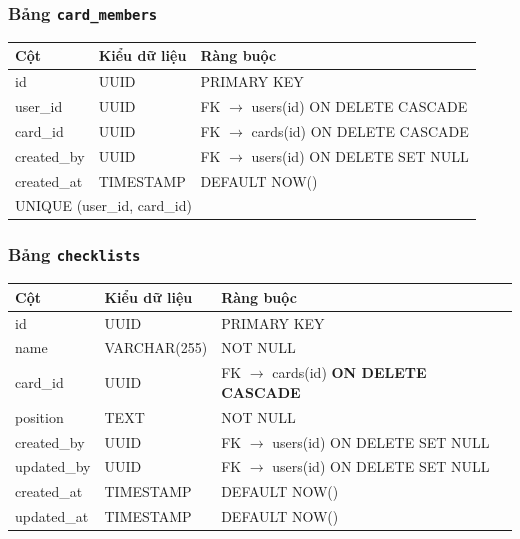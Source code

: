\subsubsection*{Bảng \texttt{card\_members}}
\begin{table}[H]
\centering
\begin{tabularx}{\textwidth}{|l|l|X|}
\hline
\rowcolor{gray!20}
\textbf{Cột} & \textbf{Kiểu dữ liệu} & \textbf{Ràng buộc} \\
\hline
id & UUID & PRIMARY KEY \\
\hline
user\_id & UUID & FK $\rightarrow$ users(id) ON DELETE CASCADE \\
\hline
card\_id & UUID & FK $\rightarrow$ cards(id) ON DELETE CASCADE \\
\hline
created\_by & UUID & FK $\rightarrow$ users(id) ON DELETE SET NULL \\
\hline
created\_at & TIMESTAMP & DEFAULT NOW() \\
\hline
\multicolumn{3}{|l|}{UNIQUE (user\_id, card\_id)} \\
\hline
\end{tabularx}
\end{table}

\subsubsection*{Bảng \texttt{checklists}}
\begin{table}[H]
\centering
\begin{tabularx}{\textwidth}{|l|l|X|}
\hline
\rowcolor{gray!20}
\textbf{Cột} & \textbf{Kiểu dữ liệu} & \textbf{Ràng buộc} \\
\hline
id & UUID & PRIMARY KEY \\
\hline
name & VARCHAR(255) & NOT NULL \\
\hline
card\_id & UUID & FK $\rightarrow$ cards(id) \textbf{ON DELETE CASCADE} \\
\hline
position & TEXT & NOT NULL \\
\hline
created\_by & UUID & FK $\rightarrow$ users(id) ON DELETE SET NULL \\
\hline
updated\_by & UUID & FK $\rightarrow$ users(id) ON DELETE SET NULL \\
\hline
created\_at & TIMESTAMP & DEFAULT NOW() \\
\hline
updated\_at & TIMESTAMP & DEFAULT NOW() \\
\hline
\end{tabularx}
\end{table}

